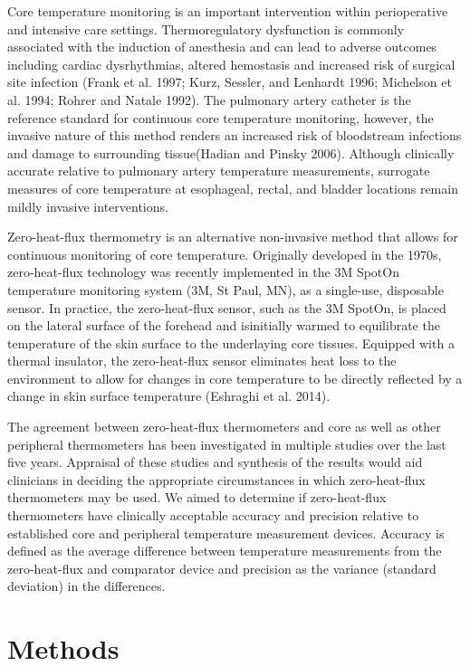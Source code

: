 \documentclass[smallextended]{svjour3}       %
\begin{document}
Core temperature monitoring is an important intervention within
perioperative and intensive care settings. Thermoregulatory dysfunction
is commonly associated with the induction of anesthesia and can lead to
adverse outcomes including cardiac dysrhythmias, altered hemostasis and
increased risk of surgical site infection (Frank et al. 1997; Kurz,
Sessler, and Lenhardt 1996; Michelson et al. 1994; Rohrer and Natale
1992). The pulmonary artery catheter is the reference standard for
continuous core temperature monitoring, however, the invasive nature of
this method renders an increased risk of bloodstream infections and
damage to surrounding tissue(Hadian and Pinsky 2006). Although
clinically accurate relative to pulmonary artery temperature
measurements, surrogate measures of core temperature at esophageal,
rectal, and bladder locations remain mildly invasive interventions.

Zero-heat-flux thermometry is an alternative non-invasive method that
allows for continuous monitoring of core temperature. Originally
developed in the 1970s, zero-heat-flux technology was recently
implemented in the 3M SpotOn temperature monitoring system (3M, St Paul,
MN), as a single-use, disposable sensor. In practice, the zero-heat-flux
sensor, such as the 3M SpotOn, is placed on the lateral surface of the
forehead and isinitially warmed to equilibrate the temperature of the
skin surface to the underlaying core tissues. Equipped with a thermal
insulator, the zero-heat-flux sensor eliminates heat loss to the
environment to allow for changes in core temperature to be directly
reflected by a change in skin surface temperature (Eshraghi et al.
2014).

The agreement between zero-heat-flux thermometers and core as well as
other peripheral thermometers has been investigated in multiple studies
over the last five years. Appraisal of these studies and synthesis of
the results would aid clinicians in deciding the appropriate
circumstances in which zero-heat-flux thermometers may be used. We aimed
to determine if zero-heat-flux thermometers have clinically acceptable
accuracy and precision relative to established core and peripheral
temperature measurement devices. Accuracy is defined as the average
difference between temperature measurements from the zero-heat-flux and
comparator device and precision as the variance (standard deviation) in
the differences.

\hypertarget{methods}{%
\section{Methods}\label{methods}}
\end{document}
